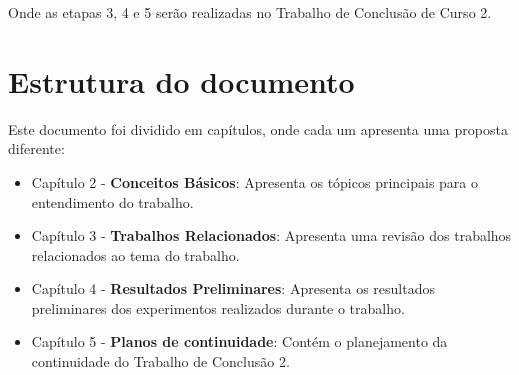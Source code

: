 Onde as etapas 3, 4 e 5 serão realizadas no Trabalho de Conclusão de Curso 2.

\section{Estrutura do documento}
Este documento foi dividido em capítulos, onde cada um apresenta uma proposta diferente:
\begin{itemize}
	\item Capítulo 2 - \textbf{Conceitos Básicos}: Apresenta os tópicos principais para o entendimento
		do trabalho.
	\item Capítulo 3 - \textbf{Trabalhos Relacionados}: Apresenta uma revisão dos trabalhos
		relacionados ao tema do trabalho.
	\item Capítulo 4 - \textbf{Resultados Preliminares}: Apresenta os resultados preliminares dos
		experimentos realizados durante o trabalho.
	\item Capítulo 5 - \textbf{Planos de continuidade}: Contém o planejamento da continuidade do
		Trabalho de Conclusão 2.
\end{itemize}
